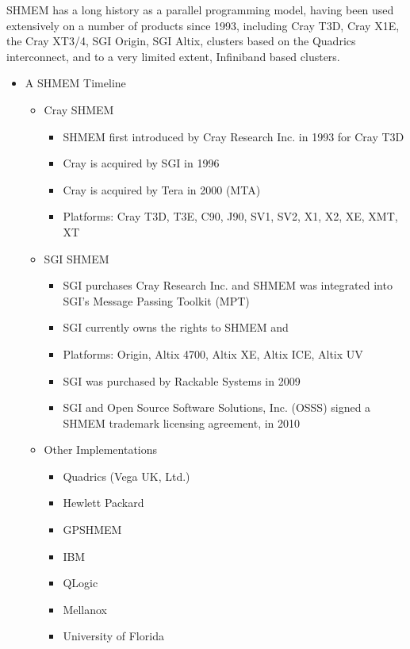 SHMEM has a long history as a parallel programming
model, having been used extensively on a number of products since
1993, including Cray T3D, Cray X1E, the Cray XT3/4, SGI Origin, SGI
Altix, clusters based on the Quadrics interconnect, and to a very
limited extent, Infiniband based clusters.

\begin{itemize}
\item A SHMEM Timeline
  \begin{itemize}
  \item Cray SHMEM
    \begin{itemize}
    \item SHMEM first introduced by Cray Research Inc. in 1993 for Cray T3D
    \item Cray is acquired by SGI in 1996
    \item Cray is acquired by Tera in 2000 (MTA)
    \item Platforms: Cray T3D, T3E, C90, J90, SV1, SV2, X1, X2, XE, XMT, XT
    \end{itemize}
  \item SGI SHMEM
    \begin{itemize}
    \item SGI purchases  Cray Research Inc. and SHMEM was integrated into
      SGI's Message Passing Toolkit (MPT)
    \item SGI currently owns the rights to SHMEM and \openshmem
    \item Platforms: Origin, Altix 4700, Altix XE, Altix ICE, Altix UV
    \item SGI was purchased by Rackable Systems in 2009
    \item SGI and Open Source Software Solutions, Inc. (OSSS) signed a
      SHMEM trademark licensing agreement, in 2010
    \end{itemize}
  \item Other Implementations
    \begin{itemize}
    \item Quadrics (Vega UK, Ltd.)
    \item Hewlett Packard
    \item GPSHMEM
    \item IBM
    \item QLogic
    \item Mellanox
    \item University of Florida
    \end{itemize}

\end{itemize}
\end{itemize}
